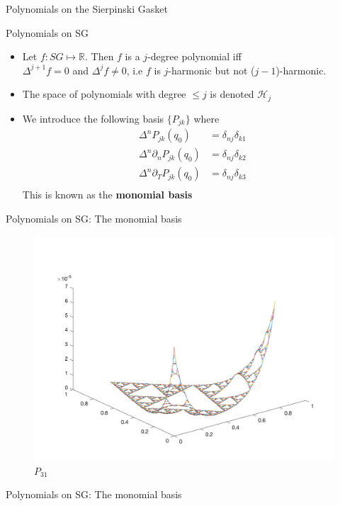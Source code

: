 \documentclass[xcolor = dvipsnames]{beamer}
\begin{document}
\begin{section}{Polynomials on the Sierpinski Gasket}
\begin{frame}{Polynomials on SG}
    \begin{itemize}
        \item Let $f: SG \mapsto \mathbb{R}$. Then $f$ is a $j$-degree polynomial iff\\
        $\Delta^{j+1}f = 0$ and $\Delta^{j}f\neq 0$, i.e $f$ is $j$-harmonic but not ($j-1$)-harmonic. 
        \pause
        \item The space of polynomials with degree $\le j$ is denoted $\mathcal{H}_{j}$
        \pause
        \item We introduce the following basis $\{P_{jk}\}$ where
        \begin{align*}
            \Delta^nP_{jk}(q_0) &= \delta_{nj}\delta_{k1}\\
            \Delta^n\partial_nP_{jk}(q_0) &= \delta_{nj}\delta_{k2}\\
            \Delta^n\partial_TP_{jk}(q_0) &= \delta_{nj}\delta_{k3}\\
        \end{align*}
        This is known as the \textbf{monomial basis}
        \end{itemize}
\end{frame}

\begin{frame}{Polynomials on SG: The monomial basis}
    \begin{figure}[H]
        \centering
        \includegraphics[width=0.75\linewidth]{Final_presentation/monomial3_1.png}
        \caption{$P_{31}$}
    \end{figure}
\end{frame}

\begin{frame}{Polynomials on SG: The monomial basis}


\end{frame}
\end{section}
\end{document}
